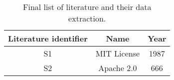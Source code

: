 
\begin{table}[h]
	\begin{center}
		\begin{tabular}{c | c | c} 
			\hline
			Literature identifier & Name & Year\\
			\hline
			S1 & MIT License & 1987 \\
			S2 & Apache 2.0 & 666 \\
		\end{tabular}
		\caption{Final list of literature and their data extraction.}
		\label{table:appendix:b}
	\end{center}
\end{table}